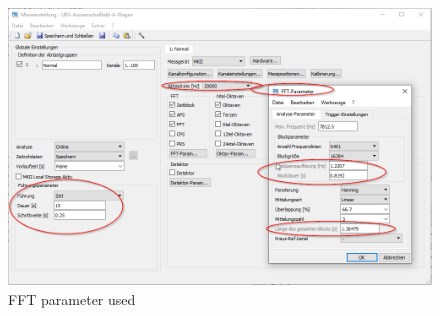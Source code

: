 \begin{figure}[H]
    \centering
    \includegraphics[width=\linewidth]{fig/fft_parameter.png}
    \caption{FFT parameter used}
    \label{fig:fftparameter}
\end{figure}

